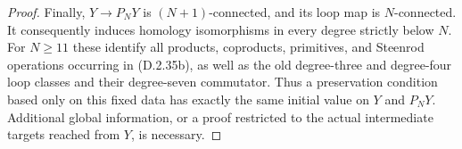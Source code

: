 \begin{proof}
Finally, $Y\to P_NY$ is $(N+1)$-connected, and its loop map
is $N$-connected. It consequently induces homology
isomorphisms in every degree strictly below $N$. For $N\geq11$
these identify all products, coproducts, primitives, and
Steenrod operations occurring in \textup{(D.2.35b)}, as well
as the old degree-three and degree-four loop classes and their
degree-seven commutator. Thus a preservation condition based
only on this fixed data has exactly the same initial value
on $Y$ and $P_NY$. Additional global information, or a proof
restricted to the actual intermediate targets reached from
$Y$, is necessary.
\end{proof}
